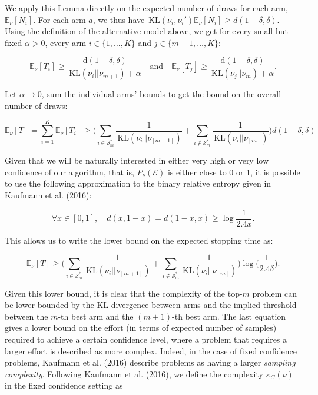 \documentclass[11pt,]{article}
\newcommand{\KL}{\,\text{KL}}
\newcommand{\der}{\,\text{d}}
\begin{document}
We apply this Lemma directly on the expected number of draws for each
arm, \(\mathbb{E}_{\nu}[N_i]\). For each arm \(a\), we thus have
\(\KL(\nu_i, \nu_i') \mathbb{E}_{\nu}[N_i] \geq d(1-\delta, \delta)\).
Using the definition of the alternative model above, we get for every
small but fixed \(\alpha > 0\), every arm \(i \in \{1, \dots, K\}\) and
\(j \in \{m+1, \dots, K\}\):

\begin{equation*}
\mathbb{E}_{\nu}[T_i] \geq \frac{\der(1-\delta, \delta)}{\KL (\nu_i || \nu_{m+1}) + \alpha} \quad \text{and} \quad \mathbb{E}_{\nu}[T_j] \geq \frac{\der(1-\delta, \delta)}{\KL (\nu_j || \nu_{m}) + \alpha}.
\end{equation*}

Let \(\alpha \to 0\), sum the individual arms' bounds to get the bound
on the overall number of draws:

\begin{equation*}
\mathbb{E}_{\nu}[T] = \sum_{i=1}^K \mathbb{E}_{\nu}[T_i] \geq \Big( \sum_{i \in \mathcal{S}_m^*} \frac{1}{\KL(\nu_i|| \nu_{[m+1]})} + \sum_{i \notin \mathcal{S}_m^*} \frac{1}{\KL(\nu_i|| \nu_{[m]})} \Big) d(1-\delta, \delta)
\end{equation*}

Given that we will be naturally interested in either very high or very
low confidence of our algorithm, that is, \(P_\nu(\mathcal{E})\) is
either close to 0 or 1, it is possible to use the following
approximation to the binary relative entropy given in Kaufmann et al.
(2016):

\begin{equation}\label{bre_approx}
\forall x \in [0,1], \quad d(x,1-x) = d(1-x,x) \geq \log \frac{1}{2.4x}.
\end{equation}

This allows us to write the lower bound on the expected stopping time
as:

\begin{equation*}
\mathbb{E}_{\nu}[T] \geq \Big( \sum_{i \in \mathcal{S}_m^*} \frac{1}{\KL(\nu_i|| \nu_{[m+1]})} + \sum_{i \notin \mathcal{S}_m^*} \frac{1}{\KL(\nu_i|| \nu_{[m]})} \Big) \log \big(\frac{1}{2.4\delta} \big).
\end{equation*}

Given this lower bound, it is clear that the complexity of the top-\(m\)
problem can be lower bounded by the KL-divergence between arms and the
implied threshold between the \(m\)-th best arm and the \((m+1)\)-th
best arm. The last equation gives a lower bound on the effort (in terms
of expected number of samples) required to achieve a certain confidence
level, where a problem that requires a larger effort is described as
more complex. Indeed, in the case of fixed confidence problems, Kaufmann
et al. (2016) describe problems as having a larger \emph{sampling
complexity}. Following Kaufmann et al. (2016), we define the complexity
\(\kappa_C(\nu)\) in the fixed confidence setting as
\end{document}
